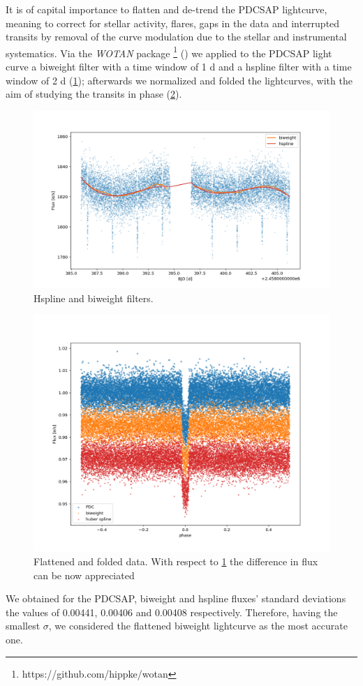 \documentclass{aa}
\begin{document}
It is of capital importance to flatten and de-trend the PDCSAP lightcurve, meaning to correct for stellar activity, 
flares, gaps in the data and interrupted transits by removal of the curve modulation due to the stellar and instrumental systematics.
Via the \textit{WOTAN} package \footnote{https://github.com/hippke/wotan} (\cite{Hippke1}) we applied to the 
PDCSAP light curve a biweight filter with a time window of 1 d and a hspline filter with a time window of 2 d 
(\ref{fig:filters}); afterwards we normalized and folded the lightcurves, with the aim of studying the transits in phase (\ref{fig:Transits}).
\begin{figure}[h]
    \includegraphics[scale=0.2, angle=0]{pictures/filters.png}
    \caption{Hspline and biweight filters.}%
   \label{fig:filters}
\end{figure}
\begin{figure}[h]
    \includegraphics[scale=0.18, angle=0]{pictures/phase.png}
    \caption{Flattened and folded data. With respect to \ref{fig:filters} the difference in flux can be now appreciated}
   \label{fig:Transits}
\end{figure}
We obtained for the PDCSAP, biweight and hspline fluxes' standard deviations the values of %
0.00441, 0.00406 and 0.00408 respectively.
Therefore, having the smallest $\sigma$, we considered the flattened biweight lightcurve as the most accurate one.
\end{document}
